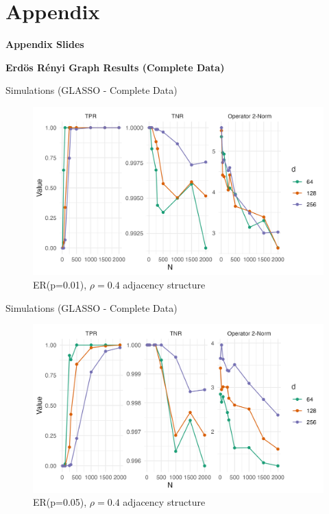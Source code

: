 \documentclass{beamer}
\begin{document}

\section*{Appendix}

\begin{frame}{}
\bf{\LARGE Appendix Slides}    
\end{frame}


\begin{frame}{}
    \bf{\LARGE Erd\"os R\'enyi Graph Results (Complete Data)}    
\end{frame}
    


\begin{frame}{Simulations (GLASSO - Complete Data)}
    \begin{figure}
        \centering 
        \includegraphics[scale=0.65]{glasso_complete_ER_FixN_01.png}
        \caption{ER(p=0.01), $\rho=0.4$ adjacency structure}
    \end{figure}
\end{frame}


\begin{frame}{Simulations (GLASSO - Complete Data)}
    \begin{figure}
        \centering 
        \includegraphics[scale=0.65]{glasso_complete_ER_FixN_05.png}
        \caption{ER(p=0.05), $\rho=0.4$ adjacency structure}
    \end{figure}
\end{frame}
\end{document}
